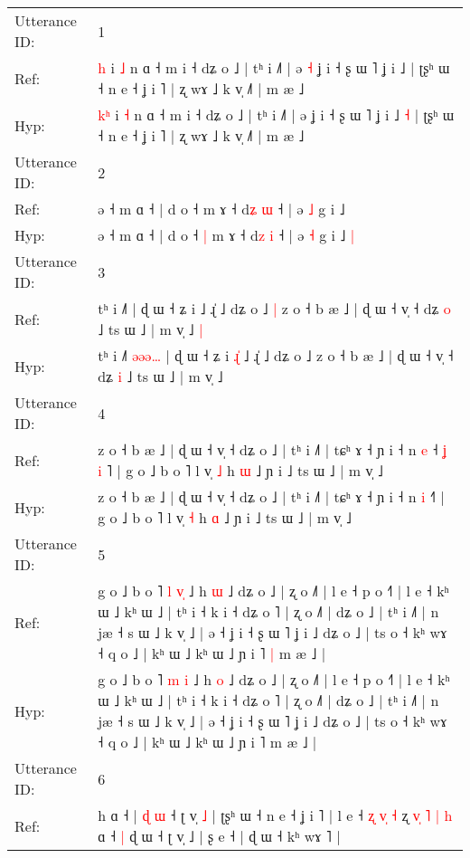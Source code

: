 \documentclass[10pt]{article}
\DeclareRobustCommand{\hl}[1]{{\textcolor{red}{#1}}}
\begin{document}
\begin{longtable}{ll}
\toprule
Utterance ID: & 1 \\
Ref: & \hl{}\hl{h} i \hl{˩} n ɑ ˧ m i ˧ dʑ o ˩ | tʰ i ˩˥ | ə\hl{ }\hl{˧} ʝ i ˧ ʂ ɯ ˥ ʝ i ˩\hl{}\hl{} | ʈʂʰ ɯ ˧ n e ˧ ʝ i ˥ | ʐ wɤ ˩ k v̩ ˩˥ | m æ ˩
 \\
Hyp: & \hl{k}\hl{ʰ} i \hl{˧} n ɑ ˧ m i ˧ dʑ o ˩ | tʰ i ˩˥ | ə\hl{}\hl{} ʝ i ˧ ʂ ɯ ˥ ʝ i ˩\hl{ }\hl{˧} | ʈʂʰ ɯ ˧ n e ˧ ʝ i ˥ | ʐ wɤ ˩ k v̩ ˩˥ | m æ ˩
 \\
\midrule
Utterance ID: & 2 \\
Ref: & ə ˧ m ɑ ˧ | d o ˧\hl{}\hl{} m ɤ ˧ d\hl{ʑ} \hl{ɯ} ˧ | ə \hl{˩} g i ˩\hl{}\hl{}
 \\
Hyp: & ə ˧ m ɑ ˧ | d o ˧\hl{ }\hl{|} m ɤ ˧ d\hl{z} \hl{i} ˧ | ə \hl{˧} g i ˩\hl{ }\hl{|}
 \\
\midrule
Utterance ID: & 3 \\
Ref: & tʰ i ˩˥\hl{}\hl{}\hl{}\hl{}\hl{} | ɖ ɯ ˧ ʑ i\hl{}\hl{}\hl{} ˩ ɻ̍ ˩ dʑ o ˩\hl{ }\hl{|} z o ˧ b æ ˩ | ɖ ɯ ˧ v̩ ˧ dʑ \hl{o} ˩ ts ɯ ˩ | m v̩ ˩\hl{ }\hl{|}
 \\
Hyp: & tʰ i ˩˥\hl{ }\hl{ə}\hl{ə}\hl{ə}\hl{…} | ɖ ɯ ˧ ʑ i\hl{ }\hl{ɻ}\hl{̍} ˩ ɻ̍ ˩ dʑ o ˩\hl{}\hl{} z o ˧ b æ ˩ | ɖ ɯ ˧ v̩ ˧ dʑ \hl{i} ˩ ts ɯ ˩ | m v̩ ˩\hl{}\hl{}
 \\
\midrule
Utterance ID: & 4 \\
Ref: & z o ˧ b æ ˩ | ɖ ɯ ˧ v̩ ˧ dʑ o ˩ | tʰ i ˩˥ | tɕʰ ɤ ˧ ɲ i ˧ n \hl{e} ˧\hl{ }\hl{ʝ}\hl{ }\hl{i}\hl{ }˥ | g o ˩ b o ˥ l v̩ \hl{˩} h \hl{ɯ} ˩ ɲ i ˩ ts ɯ ˩ | m v̩ ˩
 \\
Hyp: & z o ˧ b æ ˩ | ɖ ɯ ˧ v̩ ˧ dʑ o ˩ | tʰ i ˩˥ | tɕʰ ɤ ˧ ɲ i ˧ n \hl{i} ˧\hl{}\hl{}\hl{}\hl{}\hl{}˥ | g o ˩ b o ˥ l v̩ \hl{˧} h \hl{ɑ} ˩ ɲ i ˩ ts ɯ ˩ | m v̩ ˩
 \\
\midrule
Utterance ID: & 5 \\
Ref: & g o ˩ b o ˥ \hl{l} \hl{v}\hl{̩} ˩ h \hl{ɯ} ˩ dʑ o ˩ | ʐ o ˩˥ | l e ˧ p o ˧˥ | l e ˧ kʰ ɯ ˩ kʰ ɯ ˩ | tʰ i ˧ k i ˧ dʑ o ˥ | ʐ o ˩˥ | dʑ o ˩ | tʰ i ˩˥ | n jæ ˧ s ɯ ˩ k v̩ ˩ | ə ˧ ʝ i ˧ ʂ ɯ ˥ ʝ i ˩ dʑ o ˩ | ts o ˧ kʰ wɤ ˧ q o ˩ | kʰ ɯ ˩ kʰ ɯ ˩ ɲ i ˥\hl{ }\hl{|} m æ ˩ |
 \\
Hyp: & g o ˩ b o ˥ \hl{m} \hl{}\hl{i} ˩ h \hl{o} ˩ dʑ o ˩ | ʐ o ˩˥ | l e ˧ p o ˧˥ | l e ˧ kʰ ɯ ˩ kʰ ɯ ˩ | tʰ i ˧ k i ˧ dʑ o ˥ | ʐ o ˩˥ | dʑ o ˩ | tʰ i ˩˥ | n jæ ˧ s ɯ ˩ k v̩ ˩ | ə ˧ ʝ i ˧ ʂ ɯ ˥ ʝ i ˩ dʑ o ˩ | ts o ˧ kʰ wɤ ˧ q o ˩ | kʰ ɯ ˩ kʰ ɯ ˩ ɲ i ˥\hl{}\hl{} m æ ˩ |
 \\
\midrule
Utterance ID: & 6 \\
Ref: & h ɑ ˧ | \hl{ɖ} \hl{}\hl{ɯ} ˧ ʈ v̩ \hl{˩} | ʈʂʰ ɯ ˧ n e ˧ ʝ i ˥ | l e ˧\hl{ }\hl{ʐ}\hl{ }\hl{v}\hl{̩} \hl{˧} ʐ\hl{ }\hl{v}\hl{̩} \hl{˥}\hl{ }\hl{|} \hl{h} ɑ ˧\hl{ }\hl{|} ɖ ɯ ˧ ʈ v̩ ˩ | ʂ e ˧ | ɖ ɯ ˧ kʰ wɤ ˥ |

\end{longtable}
\end{document}
